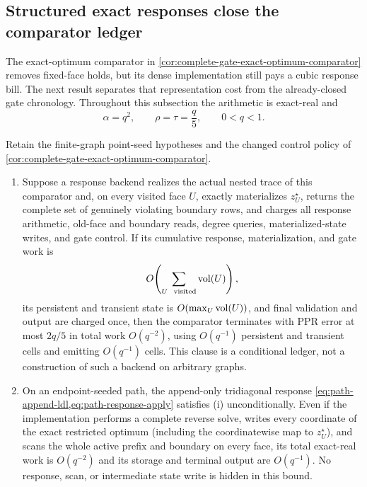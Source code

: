 \subsection{Structured exact responses close the comparator ledger}
\label{sec:structured-response-composition}

The exact-optimum comparator in
\cref{cor:complete-gate-exact-optimum-comparator} removes fixed-face holds,
but its dense implementation still pays a cubic response bill.  The next
result separates that representation cost from the already-closed gate
chronology.  Throughout this subsection the arithmetic is exact-real and
\begin{equation*}
  \alpha=q^2,
  \qquad \rho=\tau=\frac q5,
  \qquad 0<q<1.
\end{equation*}

\begin{proposition}
\label{prop:complete-gate-structured-response-composition}
Retain the finite-graph point-seed hypotheses and the changed control policy
of \cref{cor:complete-gate-exact-optimum-comparator}.

\begin{enumerate}[label=(\roman*)]
\item Suppose a response backend realizes the actual nested trace of this
  comparator and, on every visited face $U$, exactly materializes
  $z_U^\star$, returns the complete set of genuinely violating boundary
  rows, and charges all response arithmetic, old-face and boundary reads,
  degree queries, materialized-state writes, and gate control.  If its
  cumulative response, materialization, and gate work is
  \begin{equation}
    O\!\left(\sum_{U\ \text{ visited}}\operatorname{vol}(U)\right),
    \label{eq:structured-response-conditional-charge}
  \end{equation}
  its persistent and transient state is $O(\max_U\operatorname{vol}(U))$, and final
  validation and output are charged once, then the comparator terminates
  with PPR error at most $2q/5$ in total work $O(q^{-2})$, using
  $O(q^{-1})$ persistent and transient cells and emitting $O(q^{-1})$
  cells.  This clause is a conditional ledger, not a construction of such a
  backend on arbitrary graphs.

\item On an endpoint-seeded path, the append-only tridiagonal response
  \cref{eq:path-append-ldl,eq:path-response-apply} satisfies (i)
  unconditionally.  Even if the implementation performs a complete reverse
  solve, writes every coordinate of the exact restricted optimum (including
  the coordinatewise map to $z_U^\star$), and scans the whole active
  prefix and boundary on every face, its total exact-real work is
  $O(q^{-2})$ and its storage and terminal output are $O(q^{-1})$.
  No response, scan, or intermediate state write is hidden in this bound.


\end{enumerate}
\end{proposition}

